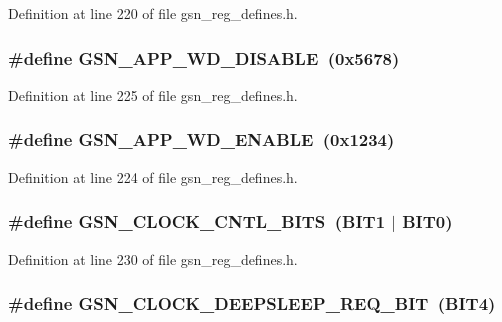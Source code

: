 Definition at line 220 of file gsn\_\-reg\_\-defines.h.

\hypertarget{a00546_ac0e30ce4e4bb977a9fc9dc561ca60d82}{
\subsubsection[{GSN\_\-APP\_\-WD\_\-DISABLE}]{\setlength{\rightskip}{0pt plus 5cm}\#define GSN\_\-APP\_\-WD\_\-DISABLE~(0x5678)}}
\label{a00546_ac0e30ce4e4bb977a9fc9dc561ca60d82}


Definition at line 225 of file gsn\_\-reg\_\-defines.h.

\hypertarget{a00546_a51137468e7f638ad3bedb94e1c8c5fef}{
\subsubsection[{GSN\_\-APP\_\-WD\_\-ENABLE}]{\setlength{\rightskip}{0pt plus 5cm}\#define GSN\_\-APP\_\-WD\_\-ENABLE~(0x1234)}}
\label{a00546_a51137468e7f638ad3bedb94e1c8c5fef}


Definition at line 224 of file gsn\_\-reg\_\-defines.h.

\hypertarget{a00546_a23ea0d4f06860ff4450bd89d05d149ab}{
\subsubsection[{GSN\_\-CLOCK\_\-CNTL\_\-BITS}]{\setlength{\rightskip}{0pt plus 5cm}\#define GSN\_\-CLOCK\_\-CNTL\_\-BITS~(BIT1 $|$ BIT0)}}
\label{a00546_a23ea0d4f06860ff4450bd89d05d149ab}


Definition at line 230 of file gsn\_\-reg\_\-defines.h.

\hypertarget{a00546_aecd9922fd7dfed622b6a0270429b5e28}{
\subsubsection[{GSN\_\-CLOCK\_\-DEEPSLEEP\_\-REQ\_\-BIT}]{\setlength{\rightskip}{0pt plus 5cm}\#define GSN\_\-CLOCK\_\-DEEPSLEEP\_\-REQ\_\-BIT~(BIT4)}}
\label{a00546_aecd9922fd7dfed622b6a0270429b5e28}


